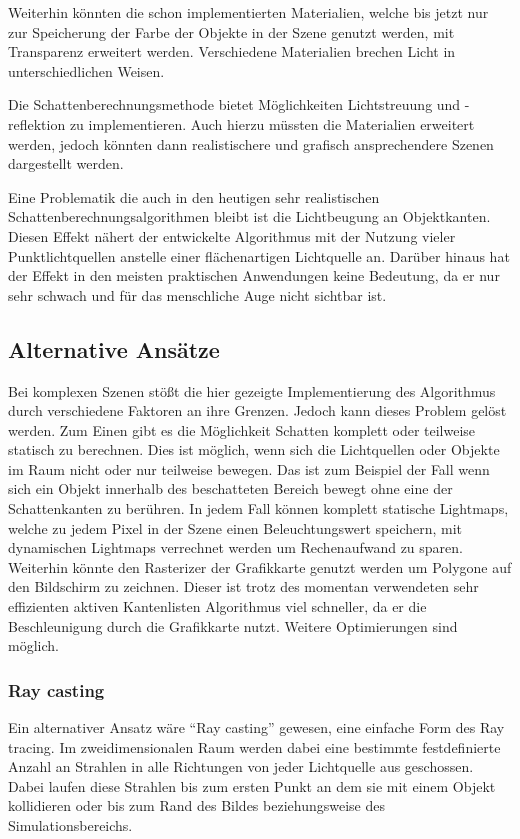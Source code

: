 Weiterhin könnten die schon implementierten Materialien, welche bis jetzt nur zur Speicherung der
Farbe der Objekte in der Szene genutzt werden, mit Transparenz erweitert werden. Verschiedene
Materialien brechen Licht in unterschiedlichen Weisen.

Die Schattenberechnungsmethode bietet Möglichkeiten Lichtstreuung und -reflektion zu
implementieren. Auch hierzu müssten die Materialien erweitert werden, jedoch könnten dann realistischere und grafisch ansprechendere Szenen dargestellt werden.

Eine Problematik die auch in den heutigen sehr realistischen Schattenberechnungsalgorithmen bleibt ist die Lichtbeugung an Objektkanten. Diesen Effekt nähert der entwickelte Algorithmus mit der Nutzung vieler Punktlichtquellen anstelle einer flächenartigen Lichtquelle an. Darüber hinaus hat der Effekt in den meisten praktischen Anwendungen keine Bedeutung, da er nur sehr schwach und für das menschliche Auge nicht sichtbar ist.

\subsection{Alternative Ansätze}

Bei komplexen Szenen stößt die hier gezeigte Implementierung des Algorithmus durch verschiedene Faktoren an ihre Grenzen. Jedoch kann dieses Problem
gelöst werden. Zum Einen gibt es die Möglichkeit Schatten komplett oder teilweise statisch zu berechnen.
Dies ist möglich, wenn sich die Lichtquellen oder Objekte im Raum nicht oder nur teilweise bewegen. Das
ist zum Beispiel der Fall wenn sich ein Objekt innerhalb des beschatteten Bereich bewegt ohne eine der
Schattenkanten zu berühren.
In jedem Fall können komplett statische Lightmaps, welche zu jedem Pixel in der Szene einen
Beleuchtungswert speichern, mit dynamischen Lightmaps verrechnet werden um Rechenaufwand zu sparen. Weiterhin könnte den Rasterizer der Grafikkarte genutzt werden um Polygone auf den Bildschirm zu zeichnen. Dieser ist trotz des momentan verwendeten sehr effizienten aktiven Kantenlisten Algorithmus viel schneller, da er die Beschleunigung durch die Grafikkarte nutzt. Weitere Optimierungen sind möglich.

\subsubsection*{Ray casting}

Ein alternativer Ansatz wäre "`Ray casting"' gewesen, eine einfache Form des Ray tracing. Im zweidimensionalen
Raum werden dabei eine bestimmte festdefinierte Anzahl an Strahlen in alle Richtungen von jeder Lichtquelle
aus geschossen. Dabei laufen diese Strahlen bis zum ersten Punkt an dem sie mit einem Objekt kollidieren
oder bis zum Rand des Bildes beziehungsweise des Simulationsbereichs.

